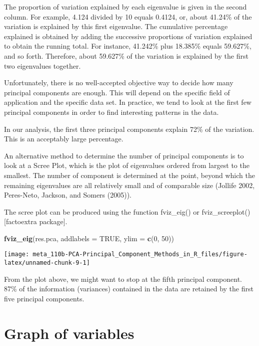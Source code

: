 \documentclass[]{book}
\newenvironment{Shaded}{\begin{snugshade}}{\end{snugshade}}
\newcommand{\DataTypeTok}[1]{\textcolor[rgb]{0.13,0.29,0.53}{#1}}
\newcommand{\DecValTok}[1]{\textcolor[rgb]{0.00,0.00,0.81}{#1}}
\newcommand{\KeywordTok}[1]{\textcolor[rgb]{0.13,0.29,0.53}{\textbf{#1}}}
\newcommand{\NormalTok}[1]{#1}
\newcommand{\OtherTok}[1]{\textcolor[rgb]{0.56,0.35,0.01}{#1}}
\begin{document}
The proportion of variation explained by each eigenvalue is given in the second column. For example, 4.124 divided by 10 equals 0.4124, or, about 41.24\% of the variation is explained by this first eigenvalue. The cumulative percentage explained is obtained by adding the successive proportions of variation explained to obtain the running total. For instance, 41.242\% plus 18.385\% equals 59.627\%, and so forth. Therefore, about 59.627\% of the variation is explained by the first two eigenvalues together.

Unfortunately, there is no well-accepted objective way to decide how many principal components are enough. This will depend on the specific field of application and the specific data set. In practice, we tend to look at the first few principal components in order to find interesting patterns in the data.

In our analysis, the first three principal components explain 72\% of the variation. This is an acceptably large percentage.

An alternative method to determine the number of principal components is to look at a Scree Plot, which is the plot of eigenvalues ordered from largest to the smallest. The number of component is determined at the point, beyond which the remaining eigenvalues are all relatively small and of comparable size (Jollife 2002, Peres-Neto, Jackson, and Somers (2005)).

The scree plot can be produced using the function fviz\_eig() or fviz\_screeplot() {[}factoextra package{]}.

\begin{Shaded}
\begin{Highlighting}[]
\KeywordTok{fviz_eig}\NormalTok{(res.pca, }\DataTypeTok{addlabels =} \OtherTok{TRUE}\NormalTok{, }\DataTypeTok{ylim =} \KeywordTok{c}\NormalTok{(}\DecValTok{0}\NormalTok{, }\DecValTok{50}\NormalTok{))}
\end{Highlighting}
\end{Shaded}

\begin{center}\texttt{[image: meta\_110b-PCA-Principal\_Component\_Methods\_in\_R\_files/figure-latex/unnamed-chunk-9-1]} \end{center}

From the plot above, we might want to stop at the fifth principal component. 87\% of the information (variances) contained in the data are retained by the first five principal components.

\hypertarget{graph-of-variables}{%
\section{Graph of variables}\label{graph-of-variables}}
\end{document}
